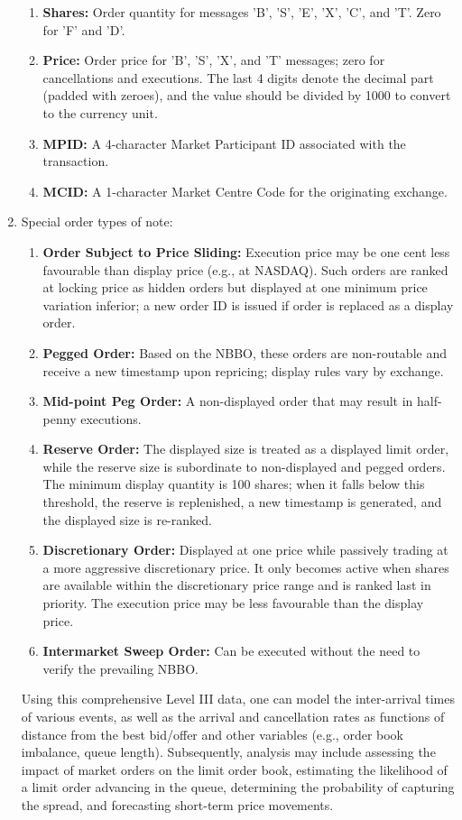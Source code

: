 \begin{definition}
\begin{enumerate}[label=\roman*.]
\begin{enumerate}[label=\arabic*.]
\item \textbf{Shares:} Order quantity for messages 'B', 'S', 'E', 'X', 'C', and 'T'. Zero for 'F' and 'D'.
\item \textbf{Price:} Order price for 'B', 'S', 'X', and 'T' messages; zero for cancellations and executions. The last 4 digits denote the decimal part (padded with zeroes), and the value should be divided by 1000 to convert to the currency unit.
\item \textbf{MPID:} A 4-character Market Participant ID associated with the transaction.
\item \textbf{MCID:} A 1-character Market Centre Code for the originating exchange.
\end{enumerate}
\item Special order types of note:
\begin{enumerate}[label=\arabic*.]
\setlength{\itemsep}{0pt}
\item \textbf{Order Subject to Price Sliding:} Execution price may be one cent less favourable than display price (e.g., at NASDAQ). Such orders are ranked at locking price as hidden orders but displayed at one minimum price variation inferior; a new order ID is issued if order is replaced as a display order.
\item \textbf{Pegged Order:} Based on the NBBO, these orders are non-routable and receive a new timestamp upon repricing; display rules vary by exchange.
\item \textbf{Mid-point Peg Order:} A non-displayed order that may result in half-penny executions.
\item \textbf{Reserve Order:} The displayed size is treated as a displayed limit order, while the reserve size is subordinate to non-displayed and pegged orders. The minimum display quantity is 100 shares; when it falls below this threshold, the reserve is replenished, a new timestamp is generated, and the displayed size is re-ranked.
\item \textbf{Discretionary Order:} Displayed at one price while passively trading at a more aggressive discretionary price. It only becomes active when shares are available within the discretionary price range and is ranked last in priority. The execution price may be less favourable than the display price.
\item \textbf{Intermarket Sweep Order:} Can be executed without the need to verify the prevailing NBBO.
\end{enumerate}
Using this comprehensive Level III data, one can model the inter-arrival times of various events, as well as the arrival and cancellation rates as functions of distance from the best bid/offer and other variables (e.g., order book imbalance, queue length). Subsequently, analysis may include assessing the impact of market orders on the limit order book, estimating the likelihood of a limit order advancing in the queue, determining the probability of capturing the spread, and forecasting short-term price movements.
\end{enumerate}
\end{definition}

